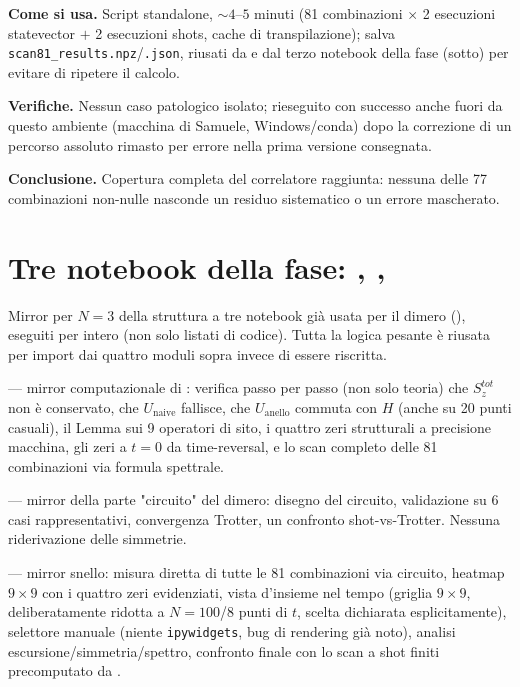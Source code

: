 \documentclass[11pt,a4paper]{article}
\begin{document}
\textbf{Come si usa.} Script standalone, $\sim4$--$5$ minuti (81 combinazioni
$\times$ 2 esecuzioni statevector $+$ 2 esecuzioni shots, cache di
transpilazione); salva \texttt{scan81\_results.npz}/\texttt{.json}, riusati da
\texttt{} e dal terzo notebook della fase
(sotto) per evitare di ripetere il calcolo.

\textbf{Verifiche.} Nessun caso patologico isolato; rieseguito con successo anche
fuori da questo ambiente (macchina di Samuele, Windows/conda) dopo la correzione di
un percorso assoluto rimasto per errore nella prima versione consegnata.

\textbf{Conclusione.} Copertura completa del correlatore raggiunta: nessuna delle
77 combinazioni non-nulle nasconde un residuo sistematico o un errore mascherato.

\section*{Tre notebook della fase: \texttt{}, \texttt{}, \texttt{}}

Mirror per $N=3$ della struttura a tre notebook già usata per il dimero
(\texttt{}), eseguiti per intero (non
solo listati di codice). Tutta la logica pesante è riusata per import dai quattro
moduli sopra invece di essere riscritta.

\textbf{\texttt{}} — mirror
computazionale di
\texttt{}: verifica passo per
passo (non solo teoria) che $S_z^{tot}$ non è conservato, che $U_\text{naive}$
fallisce, che $U_\text{anello}$ commuta con $H$ (anche su 20 punti casuali), il
Lemma sui 9 operatori di sito, i quattro zeri strutturali a precisione macchina, gli
zeri a $t=0$ da time-reversal, e lo scan completo delle 81 combinazioni via formula
spettrale.

\textbf{\texttt{}} —
mirror della parte "circuito" del dimero: disegno del circuito, validazione su 6
casi rappresentativi, convergenza Trotter, un confronto shot-vs-Trotter. Nessuna
riderivazione delle simmetrie.

\textbf{\texttt{}} —
mirror snello: misura diretta di tutte le 81 combinazioni via circuito, heatmap
$9\times9$ con i quattro zeri evidenziati, vista d'insieme nel tempo (griglia
$9\times9$, deliberatamente ridotta a $N=100$/8 punti di $t$, scelta dichiarata
esplicitamente), selettore manuale (niente \texttt{ipywidgets}, bug di rendering
già noto), analisi escursione/simmetria/spettro, confronto finale con lo scan a
shot finiti precomputato da \texttt{}.
\end{document}
